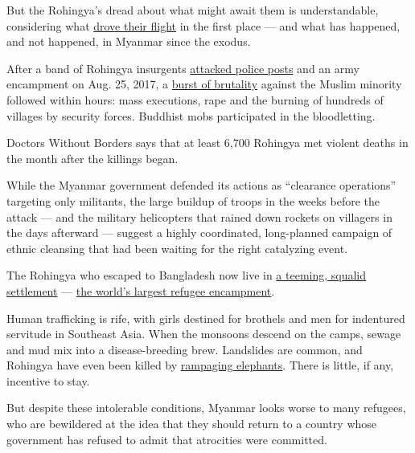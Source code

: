 But the Rohingya's dread about what might await them is understandable,
considering what
\href{https://www.nytimes3xbfgragh.onion/2017/09/02/world/asia/rohingya-myanmar-bangladesh-refugees-massacre.html}{drove
their flight} in the first place --- and what has happened, and not
happened, in Myanmar since the exodus.

After a band of Rohingya insurgents
\href{https://www.nytimes3xbfgragh.onion/2017/09/17/world/asia/myanmar-rohingya-militants.html?module=inline}{attacked
police posts} and an army encampment on Aug. 25, 2017, a
\href{https://www.nytimes3xbfgragh.onion/2017/10/11/world/asia/rohingya-myanmar-atrocities.html}{burst
of brutality} against the Muslim minority followed within hours: mass
executions, rape and the burning of hundreds of villages by security
forces. Buddhist mobs participated in the bloodletting.

Doctors Without Borders says that at least 6,700 Rohingya met violent
deaths in the month after the killings began.

While the Myanmar government defended its actions as ``clearance
operations'' targeting only militants, the large buildup of troops in
the weeks before the attack --- and the military helicopters that rained
down rockets on villagers in the days afterward --- suggest a highly
coordinated, long-planned campaign of ethnic cleansing that had been
waiting for the right catalyzing event.

The Rohingya who escaped to Bangladesh now live in
\href{https://www.nytimes3xbfgragh.onion/2017/09/29/world/asia/rohingya-refugees-myanmar-bangladesh.html}{a
teeming, squalid settlement} ---
\href{https://www.nytimes3xbfgragh.onion/2018/03/14/climate/bangladesh-rohingya-refugee-camp.html}{the
world's largest refugee encampment}.

Human trafficking is rife, with girls destined for brothels and men for
indentured servitude in Southeast Asia. When the monsoons descend on the
camps, sewage and mud mix into a disease-breeding brew. Landslides are
common, and Rohingya have even been killed by
\href{https://www.nytimes3xbfgragh.onion/2018/02/22/world/asia/elephant-tramples-rohingya-bangladesh.html}{rampaging
elephants}. There is little, if any, incentive to stay.

But despite these intolerable conditions, Myanmar looks worse to many
refugees, who are bewildered at the idea that they should return to a
country whose government has refused to admit that atrocities were
committed.

